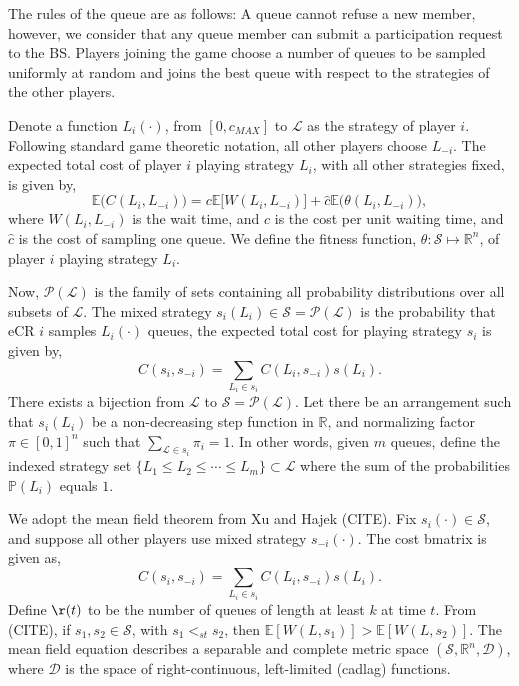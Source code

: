 \documentclass[10pt]{article}
\newcommand{\mcL}{\mathcal{L}}
\newcommand{\mcP}{\mathcal{P}}
\newcommand{\mcS}{\mathcal{S}}
\newcommand{\mcD}{\mathcal{D}}
\theoremstyle{definition}
\begin{document}
The rules of the queue are as follows:
A queue cannot refuse a new member, however, we
consider that any queue member can submit a participation request to the BS.
Players joining the game choose a number of queues to be sampled uniformly at random and joins the best queue with respect
to the strategies of the other players. 

Denote a function $L_i(\cdot)$, from
$[0, c_{MAX}]$ to $\mcL$ as the strategy of player $i$. Following
standard game theoretic notation, all other players choose $L_{-i}$.
The expected total cost of player $i$ playing 
strategy $L_i$, with all other strategies fixed, is given by, 
$$
    \mathbb{E}\big(C(L_i,L_{-i})\big) = c\mathbb{E}\lbrack W(L_i,L_{-i})\rbrack + \hat c
    \mathbb{E}\big(\theta(L_i,L_{-i})\big),
$$
where $W(L_i,L_{-i})$ is the wait time, and
$c$ is the cost per unit waiting time, and $\hat c$ is the cost of sampling one queue. 
We define the fitness function, $\theta:\mcS \mapsto \mathbb{R}^n$, of player $i$ playing strategy $L_i$. 

Now, $\mcP(\mcL)$ is the family of sets containing all probability distributions over
all subsets of $\mcL$. The mixed
strategy $s_i(L_i) \in \mcS=\mcP(\mcL)$ is the probability that
eCR $i$ samples $L_i(\cdot)$ queues, 
the expected total cost for playing strategy $s_i$ is given by,
$$
    C(s_i, s_{-i}) = \displaystyle \sum_{L_i \in s_i} C(L_i,s_{-i})s(L_i).
$$
There exists a bijection from $\mcL$ to $\mcS=\mcP(\mcL)$. Let there be an
arrangement such that $s_i(L_i)$ be a non-decreasing step function in
$\mathbb{R}$, and normalizing factor $\pi \in [0,1]^n$ such that $\sum_{\mcL \in
s_i} \pi_i = 1$. In other words, given $m$ queues, 
define the indexed strategy set $\lbrace L_1 \le L_2 \le\cdots \le L_m\rbrace
\subset \mcL$ where the sum of the probabilities $\mathbb{P}(L_i)$ equals $1$.

We adopt the mean field theorem from Xu and Hajek (CITE).
Fix $s_i(\cdot) \in \mcS$, and suppose all other players use mixed strategy
$s_{-i}(\cdot)$. 
The cost bmatrix is given as,
$$
    C(s_i, s_{-i}) = \displaystyle \sum_{L_i \in s_i} C(L_i,s_{-i})s(L_i).
$$
Define $\r(t)$ to be the number of queues of length at least $k$ at time $t$.
From (CITE), if $s_1,s_2\in\mcS$, with $s_1<_{st} s_2$, then
$\mathbb{E}[W(L,s_1)] > \mathbb{E}[W(L,s_2)]$.
The mean field equation describes a separable and complete metric space
$(\mcS, \mathbb{R}^n, \mcD)$, where $\mcD$ is the space of right-continuous, left-limited (cadlag) functions.
\end{document}
